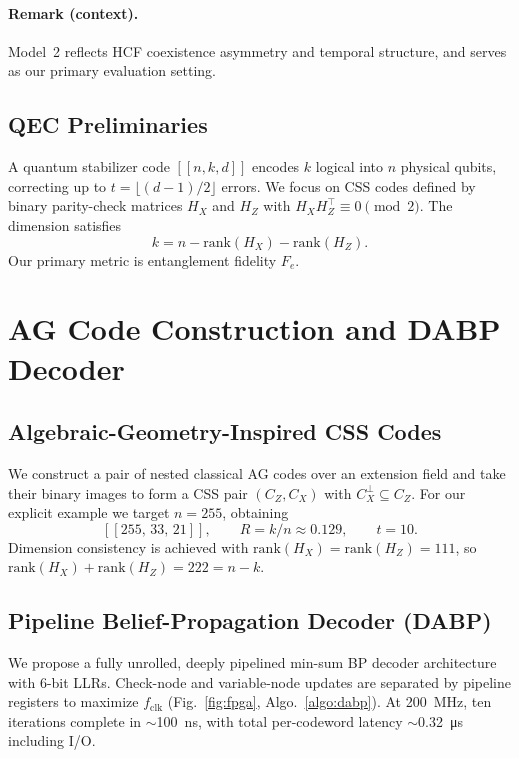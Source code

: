 \documentclass[conference]{IEEEtran}
\begin{document}
\paragraph*{Remark (context).}
Model~2 reflects HCF coexistence asymmetry and temporal structure, and serves as our primary evaluation setting.

\subsection{QEC Preliminaries}
A quantum stabilizer code \( [[n,k,d]] \) encodes \(k\) logical into \(n\) physical qubits, correcting up to \(t=\lfloor(d-1)/2\rfloor\) errors. We focus on CSS codes defined by binary parity-check matrices \(H_X\) and \(H_Z\) with \(H_X H_Z^\top\equiv 0 \pmod{2}\). The dimension satisfies
\begin{equation}
k = n - \mathrm{rank}(H_X) - \mathrm{rank}(H_Z).
\end{equation}
Our primary metric is entanglement fidelity \(F_e\).

\section{AG Code Construction and DABP Decoder}\label{sec:code_decoder}

\subsection{Algebraic-Geometry-Inspired CSS Codes}
We construct a pair of nested classical AG codes over an extension field and take their binary images to form a CSS pair \((C_Z,C_X)\) with \(C_X^\perp \subseteq C_Z\). For our explicit example we target \(n=255\), obtaining
\[
  [[255,\,33,\,21]] ,\qquad R=k/n\approx 0.129,\qquad t=10.
\]
Dimension consistency is achieved with \(\mathrm{rank}(H_X)=\mathrm{rank}(H_Z)=111\), so \(\mathrm{rank}(H_X)+\mathrm{rank}(H_Z)=222=n-k\).

\subsection{Pipeline Belief-Propagation Decoder (DABP)}\label{sec:implementation}
We propose a fully unrolled, deeply pipelined min-sum BP decoder architecture with 6-bit LLRs. Check-node and variable-node updates are separated by pipeline registers to maximize \(f_\mathrm{clk}\) (Fig.~\ref{fig:fpga}, Algo.~\ref{algo:dabp}). At \SI{200}{\mega\hertz}, ten iterations complete in \(\sim\)\SI{100}{\nano\second}, with total per-codeword latency \(\sim\)\SI{0.32}{\micro\second} including I/O.
\end{document}

